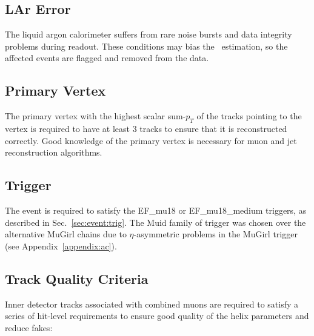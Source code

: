 \subsection{LAr Error}
The liquid argon calorimeter suffers from rare noise bursts and data integrity problems during readout. These conditions may bias the \met\ estimation, so the affected events are flagged and removed from the data.
 
\subsection{Primary Vertex}
The primary vertex with the highest scalar sum-$p_T$ of the tracks pointing to the vertex is required to have at least 3 tracks to ensure that it is reconstructed correctly. Good knowledge of the primary vertex is necessary for muon and jet reconstruction algorithms.

\subsection{Trigger}
The event is required to satisfy the EF\_mu18 or EF\_mu18\_medium triggers, as described in Sec.~\ref{sec:event:trig}. The Muid family of trigger was chosen over the alternative MuGirl chains due to $\eta$-asymmetric problems in the MuGirl trigger (see Appendix~\ref{appendix:ac}).

\subsection{Track Quality Criteria}
\label{subsec:TrackQuality}
Inner detector tracks associated with combined muons are required to satisfy a series of hit-level requirements to ensure good quality of the helix parameters and reduce fakes:

